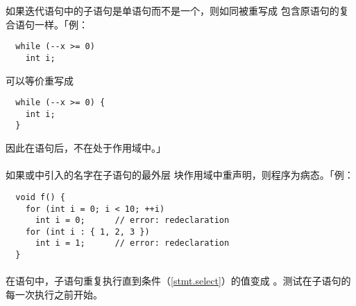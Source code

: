 如果迭代语句中的子语句是单语句而不是一个，则如同被重写成
包含原语句的复合语句一样。「例：
\begin{lstlisting}
  while (--x >= 0)
    int i;
\end{lstlisting}
可以等价重写成
\begin{lstlisting}
  while (--x >= 0) {
    int i;
  }
\end{lstlisting}
因此在语句后，不在处于作用域中。」

\paragraph{}
如果或中引入的名字在子语句的最外层
块作用域中重声明，则程序为病态。「例：
\begin{lstlisting}
  void f() {
    for (int i = 0; i < 10; ++i)
      int i = 0;      // error: redeclaration
    for (int i : { 1, 2, 3 })
      int i = 1;      // error: redeclaration
  }
\end{lstlisting}

\paragraph{}
在语句中，子语句重复执行直到条件（\ref{stmt.select}）的值变成
。测试在子语句的每一次执行之前开始。

